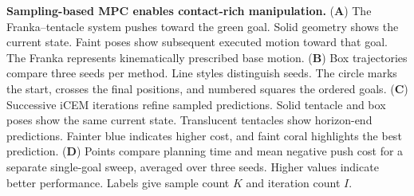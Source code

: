 \caption{\textbf{Sampling-based MPC enables contact-rich manipulation.}
(\textbf{A}) The Franka--tentacle system pushes toward the green goal. Solid geometry shows the current state. Faint poses show subsequent executed motion toward that goal. The Franka represents kinematically prescribed base motion.
(\textbf{B}) Box trajectories compare three seeds per method. Line styles distinguish seeds. The circle marks the start, crosses the final positions, and numbered squares the ordered goals.
(\textbf{C}) Successive iCEM iterations refine sampled predictions. Solid tentacle and box poses show the same current state. Translucent tentacles show horizon-end predictions. Fainter blue indicates higher cost, and faint coral highlights the best prediction.
(\textbf{D}) Points compare planning time and mean negative push cost for a separate single-goal sweep, averaged over three seeds. Higher values indicate better performance. Labels give sample count $K$ and iteration count $I$.}
